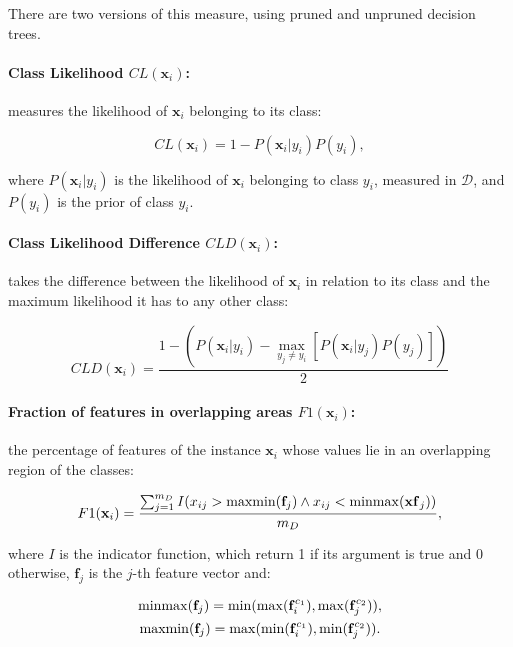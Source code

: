 There are two versions of this measure, using pruned and unpruned decision trees.

\paragraph*{Class Likelihood $CL(\mathbf{x}_i)$:} measures the likelihood of $\mathbf{x}_i$ belonging to its class:

\begin{equation}
	CL(\mathbf{x}_i) = 1 - P(\mathbf{x}_i| y_i) P(y_i),
\end{equation}

where $P(\mathbf{x}_i| y_i)$ is the likelihood of $\mathbf{x}_i$ belonging to class $y_i$, measured in $\mathcal{D}$, and $P(y_i)$ is the prior of class $y_i$.

\paragraph*{Class Likelihood Difference $CLD(\mathbf{x}_i)$:} takes the difference between the likelihood of $\mathbf{x}_i$ in relation to its class and the maximum likelihood it has to any other class:

\begin{equation}
	CLD(\mathbf{x}_i) = \frac{1 - (P(\mathbf{x}_i | y_i) - \max_{y_j \neq y_i}[P(\mathbf{x}_i | y_j) P(y_j)] ) }{2}
\end{equation}

\paragraph*{Fraction of features in overlapping areas $F1(\mathbf{x}_i)$:} the percentage of features of the instance $\mathbf{x}_i$ whose values lie in an overlapping region of the classes:

\begin{equation}
	F1(\mathbf{x}_i) = \frac{\sum_{j=1}^{m_D} I(x_{ij} > \operatorname{maxmin}(\mathbf{f}_j) \wedge x_{ij} < \operatorname{minmax}(\mathbf{xf}_j)) }{m_D},
\end{equation}

where $I$ is the indicator function, which return 1 if its argument is true and 0 otherwise, $\mathbf{f}_j$ is the $j$-th feature vector and:

\begin{gather}
	\operatorname{minmax}(\mathbf{f}_j) = \min(\max(\mathbf{f}_i^{c_1}), \max(\mathbf{f}_j^{c_2})), \\
	\operatorname{maxmin}(\mathbf{f}_j) = \max(\min(\mathbf{f}_i^{c_1}), \min(\mathbf{f}_j^{c_2})).
\end{gather}

